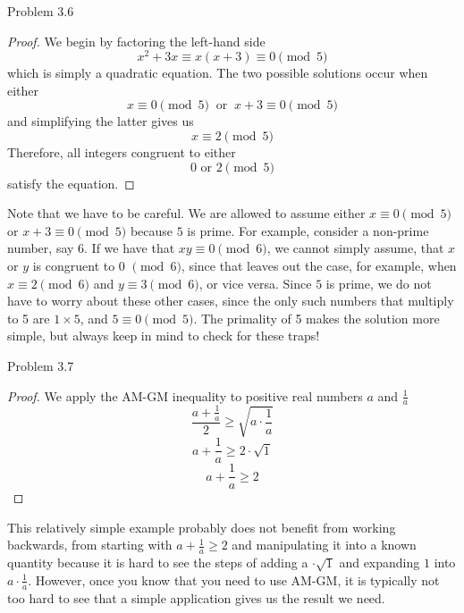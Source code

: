 \begin{sol}{Problem 3.6}
\begin{proof}
We begin by factoring the left-hand side
\[
x^2 + 3x \equiv x(x+3) \equiv 0 \pmod{5}
\]
which is simply a quadratic equation. The two possible solutions occur when either 
\[
x \equiv 0 \pmod{5} ~\text{  or  } ~x + 3 \equiv 0 \pmod{5}
\]
and simplifying the latter gives us
\[
x \equiv 2 \pmod{5}
\]
Therefore, all integers congruent to either 
\[
\boxed{0 \text{ or } 2 \pmod{5}}
\]
satisfy the equation.
\end{proof}
Note that we have to be careful. We are allowed to assume either $x \equiv 0 \pmod{5}$ or $x + 3 \equiv 0 \pmod{5}$ because $5$ is prime. For example, consider a non-prime number, say 6. If we have that $xy \equiv 0 \pmod{6}$, we cannot simply assume, that $x$ or $y$ is congruent to 0 $\pmod{6}$, since that leaves out the case, for example, when $x \equiv 2 \pmod{6}$ and $y \equiv 3 \pmod{6}$, or vice versa. Since $5$ is prime, we do not have to worry about these other cases, since the only such numbers that multiply to 5 are $1 \times 5$, and $5 \equiv 0 \pmod{5}$. The primality of 5 makes the solution more simple, but always keep in mind to check for these traps!
\end{sol}

\begin{sol}{Problem 3.7}
\begin{proof}
We apply the AM-GM inequality to positive real numbers $a$ and $\frac{1}{a}$
\[
\frac{a + \frac{1}{a}}{2} \geq \sqrt{a \cdot \frac{1}{a}}
\]
\[
a + \frac{1}{a} \geq 2 \cdot \sqrt{1}
\]
\[
a + \frac{1}{a} \geq 2
\]
\end{proof}
This relatively simple example probably does not benefit from working backwards, from starting with $a + \frac{1}{a} \geq 2$ and manipulating it into a known quantity because it is hard to see the steps of adding a $\cdot \sqrt{1}$ and expanding $1$ into $a \cdot \frac{1}{a}$. However, once you know that you need to use AM-GM, it is typically not too hard to see that a simple application gives us the result we need.
\end{sol}

